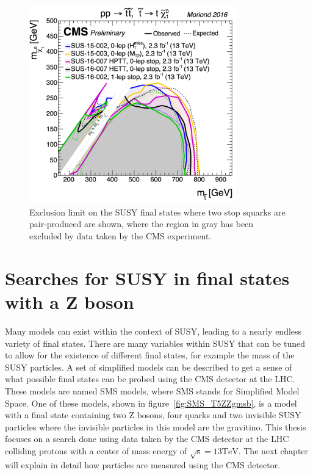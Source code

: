 \begin{figure}[!htb]
  \begin{center}
    \includegraphics[width=0.8\textwidth]{intro/figs/T2tt_moriond2016.pdf}
    \caption{
      \label{fig:T2tt_limits}
      Exclusion limit on the SUSY final states where two stop squarks are pair-produced are shown,
      where the region in gray has been excluded by data taken by the CMS experiment.
    }
  \end{center}
\end{figure}

\section{Searches for SUSY in final states with a Z boson}
\label{sec:signalmodel}
Many models can exist within the context of SUSY, leading to a nearly endless variety of final states.
There are many variables within SUSY that can be tuned to allow for the existence of different final states, for example the mass of the SUSY particles.
A set of simplified models can be described to get a sense of what possible final states can be probed using the CMS detector at the LHC.
These models are named SMS models, where SMS stands for Simplified Model Space.
One of these models, shown in figure~\ref{fig:SMS_T5ZZgmsb}, is a model with a final state containing two Z bosons,
four quarks and two invisible SUSY particles where the invisible particles in this model are the gravitino.
This thesis focuses on a search done using data taken by the CMS detector at the LHC colliding protons with a center of mass energy of $\mathrm{\sqrt{s}=13 TeV}$.
The next chapter will explain in detail how particles are measured using the CMS detector.

